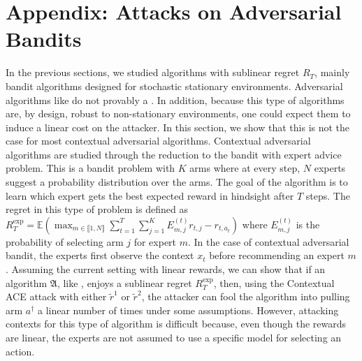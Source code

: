 \section{Appendix: Attacks on Adversarial Bandits}\label{app:adversarial_rewards}
In the previous sections, we studied algorithms with sublinear regret $R_T$, \ie mainly bandit algorithms designed for stochastic stationary environments. Adversarial algorithms like \expfour do not provably  a . In addition, because this type of algorithms are, by design, robust to non-stationary environments, one could expect them to induce a linear cost on the attacker. In this section, we show that this is not the case for most contextual adversarial algorithms. Contextual adversarial algorithms are studied through the reduction to the bandit with expert advice problem. This is a bandit problem with $K$ arms where at every step, $N$ experts suggest a probability distribution over the arms. The goal of the algorithm is to learn which expert gets the best expected reward in hindsight after $T$ steps. The regret in this type of problem is defined as $R_{T}^{\text{exp}} = \mathbb{E}\left( \max_{m\in \llbracket 1, N \rrbracket}\sum_{t=1}^{T} \sum_{j=1}^{K} E_{m,j}^{(t)}r_{t,j} - r_{t,a_{t}}\right)$
where $E_{m,j}^{(t)}$ is the probability of selecting arm $j$ for expert $m$. In the case of contextual adversarial bandit, the experts first observe the context $x_{t}$ before recommending an expert $m$. 
Assuming the current setting with linear rewards, we can show that if an algorithm $\mathfrak{A}$, like \expfour, enjoys a sublinear regret $R_{T}^{\text{exp}}$, then, using the Contextual ACE attack with either $\tilde{r}^{1}$ or $\tilde{r}^{2}$, the attacker can fool the algorithm into pulling arm $a^{\dagger}$ a linear number of times under some  assumptions. However, attacking contexts for this type of algorithm is difficult because, even though the rewards are linear, the experts are not assumed to use a specific model for selecting an action.

